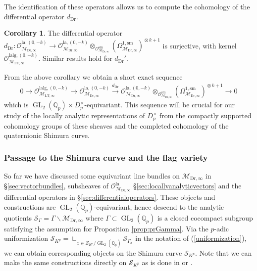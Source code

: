 \documentclass{article}
\theoremstyle{definition}
\newtheorem{corollary}[theorem]{Corollary}
\def\calM{\mathcal{M}}
\def\calO{\mathcal{O}}
\def\calS{\mathcal{S}}
\def\bbQ{\mathbb{Q}}
\def\bs{\backslash}
\DeclareMathOperator{\ox}{\otimes}
\DeclareMathOperator{\GL}{GL}
\def\LT{\mathrm{LT}}
\def\lan{\mathrm{la}}
\def\sm{\mathrm{sm}}
\def\lalg{\mathrm{lalg}}
\def\Dr{\mathrm{Dr}}
\begin{document}
The identification of these operators allows us to compute the cohomology of the differential operator $d_{\Dr}$.
\begin{corollary}\label{cor:kerdDr}
The differential operator $d_{\Dr}:\calO_{\calM_{\Dr,\infty}}^{\lan,(0,-k)} \to  \calO_{\calM_{\Dr,\infty}}^{\lan,(0,-k)}\ox_{\calO_{\calM_{\Dr,\infty}}^{\sm}}(\Omega^{1,\sm}_{\calM_{\Dr,\infty}})^{\ox k+1}$ is surjective, with kernel $\calO_{\calM_{\LT,\infty}}^{\lalg,(0,-k)}$. Similar results hold for $d_{\Dr}'$.
\end{corollary}
From the above corollary we obtain a short exact sequence
\begin{align}\label{equationdDr}
    0\rightarrow \calO_{\calM_{\LT,\infty}}^{\lalg,(0,-k)}\rightarrow \calO_{\calM_{\Dr,\infty}}^{\lan,(0,-k)} \stackrel{d_{\Dr}}{\rightarrow}  \calO_{\calM_{\Dr,\infty}}^{\lan,(0,-k)}\ox_{\calO_{\calM_{\Dr,\infty}}^{\sm}}(\Omega^{1,\sm}_{\calM_{\Dr,\infty}})^{\ox k+1}\rightarrow 0
\end{align}
which is $\GL_2(\bbQ_p)\times D_p^{\times}$-equivariant. This sequence will be crucial for our study of the locally analytic representations of $D_p^{\times}$ from the compactly supported cohomology groups of these sheaves and the completed cohomology of the quaternionic Shimura curve.
\subsubsection{Passage to the Shimura curve and the flag variety}\label{sec:passageShimura}
So far we have discussed some equivariant line bundles on $\calM_{\Dr,\infty}$ in \S\ref{sec:vectorbundles}, subsheaves of $\calO_{\calM_{\Dr,\infty}}^{\lan}$ \S\ref{sec:locallyanalyticvectors} and the differential operators in \S\ref{sec:differentialoperators}. These objects and constructions are $\GL_2(\bbQ_p)$-equivariant, hence descend to the analytic quotients $\calS_{\Gamma}=\Gamma \bs\calM_{\Dr,\infty}$ where $\Gamma\subset \GL_2(\bbQ_p)$ is a closed cocompact subgroup satisfying the assumption for Proposition \ref{prop:prGamma}.  Via the $p$-adic uniformization $\calS_{K^p}=\sqcup_{x\in  Z_{K^p}/\GL_2(\bbQ_p) }\calS_{\Gamma_x}$ in the notation of (\ref{uniformization}), we can obtain corresponding objects on the Shimura curve $\calS_{K^p}$. Note that we can make the same constructions directly on $\calS_{K^p}$ as is done in \cite{PanII} or \cite{QS24}. 
\end{document}
